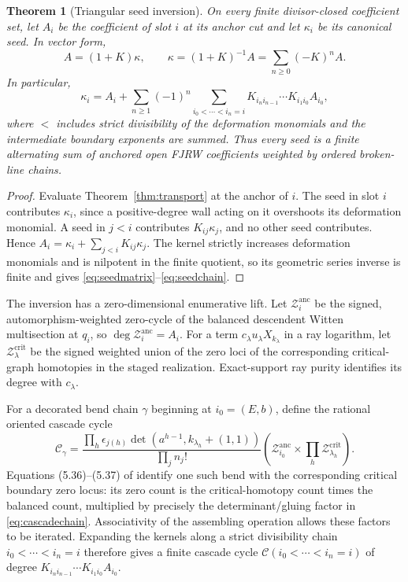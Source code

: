 \documentclass[11pt]{amsart}
\newtheorem{theorem}{Theorem}[section]
\theoremstyle{definition}
\theoremstyle{remark}
\begin{document}
\begin{theorem}[Triangular seed inversion]
\label{thm:seedinversion}
On every finite divisor-closed coefficient set, let $A_i$ be the coefficient
of slot $i$ at its anchor cut and let $\kappa_i$ be its canonical seed.  In
vector form,
\begin{equation}
\label{eq:seedmatrix}
 A=(1+K)\kappa,\qquad
 \kappa=(1+K)^{-1}A=\sum_{n\ge0}(-K)^nA.
\end{equation}
In particular,
\begin{equation}
\label{eq:seedchain}
 \kappa_i=A_i+
 \sum_{n\ge1}(-1)^n
 \sum_{i_0<\cdots<i_n=i}
 K_{i_ni_{n-1}}\cdots K_{i_1i_0}A_{i_0},
\end{equation}
where $<$ includes strict divisibility of the deformation monomials and the
intermediate boundary exponents are summed.  Thus every seed is a finite
alternating sum of anchored open FJRW coefficients weighted by ordered
broken-line chains.
\end{theorem}

\begin{proof}
Evaluate Theorem~\ref{thm:transport} at the anchor of $i$.  The seed in slot
$i$ contributes $\kappa_i$, since a positive-degree wall acting on it
overshoots its deformation monomial.  A seed in $j<i$ contributes
$K_{ij}\kappa_j$, and no other seed contributes.  Hence
$A_i=\kappa_i+\sum_{j<i}K_{ij}\kappa_j$.  The kernel strictly increases
deformation monomials and is nilpotent in the finite quotient, so its geometric
series inverse is finite and gives
\eqref{eq:seedmatrix}--\eqref{eq:seedchain}.  \qedhere
\end{proof}

The inversion has a zero-dimensional enumerative lift.  Let
$\mathcal Z_i^{\mathrm{anc}}$ be the signed, automorphism-weighted zero-cycle
of the balanced descendent Witten multisection at $q_i$, so
$\deg\mathcal Z_i^{\mathrm{anc}}=A_i$.  For a term
$c_\lambda u_\lambda X_{k_\lambda}$ in a ray logarithm, let
$\mathcal Z_\lambda^{\mathrm{crit}}$ be the signed weighted union of the zero
loci of the corresponding critical-graph homotopies in the staged
realization.  Exact-support ray purity identifies its degree with $c_\lambda$.

For a decorated bend chain $\gamma$ beginning at $i_0=(E,b)$, define the
rational oriented cascade cycle
\begin{equation}
\label{eq:cascadechain}
 \mathcal C_\gamma=
 \frac{\prod_h\epsilon_{j(h)}
 \det(a^{h-1},k_{\lambda_h}+(1,1))}{\prod_jn_j!}
 \left(\mathcal Z_{i_0}^{\mathrm{anc}}
 \times\prod_h\mathcal Z_{\lambda_h}^{\mathrm{crit}}\right).
\end{equation}
Equations (5.36)--(5.37) of \cite{GKT} identify one such bend with the corresponding
critical boundary zero locus: its zero count is the critical-homotopy count
times the balanced count, multiplied by precisely the determinant/gluing
factor in \eqref{eq:cascadechain}.  Associativity of the assembling operation
\cite[\S2.3.2]{GKT} allows these
factors to be iterated.  Expanding the kernels along a strict divisibility
chain $i_0<\cdots<i_n=i$ therefore gives a finite cascade cycle
$\mathcal C(i_0<\cdots<i_n=i)$ of degree
$K_{i_ni_{n-1}}\cdots K_{i_1i_0}A_{i_0}$.
\end{document}
